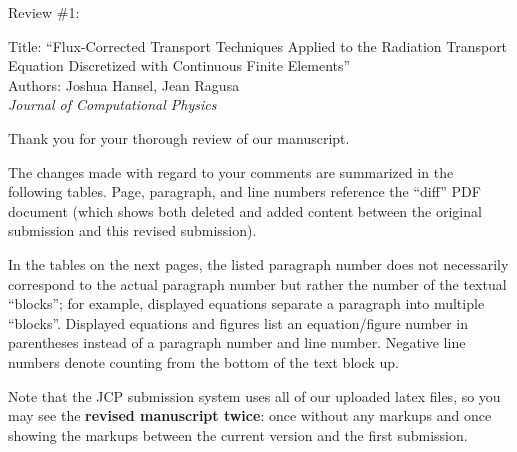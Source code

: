 
\pagestyle{empty}



Review \#1:

Title: ``Flux-Corrected Transport Techniques Applied to the Radiation Transport Equation Discretized with Continuous Finite Elements''\\
Authors: Joshua Hansel, Jean Ragusa \\
{\it Journal of Computational Physics}\\
\vspace{3cm}

Thank you for your thorough review of our manuscript.

The changes made with regard to your comments are summarized in the following
tables. Page, paragraph, and line numbers reference
the ``diff'' PDF document (which shows both deleted and added content between the original submission and this revised submission).

In the tables on the next pages, the listed paragraph number does not necessarily correspond to the actual paragraph number
but rather the number of the textual ``blocks''; for example, displayed equations
separate a paragraph into multiple ``blocks''. Displayed equations and figures
list an equation/figure number in parentheses instead of a paragraph number
and line number. Negative line numbers denote counting from the bottom of the
text block up.

Note that the JCP submission system uses all of our uploaded latex files, so you may see the {\bf revised manuscript twice}: once without any markups and once showing the markups between the current version and the first submission.



